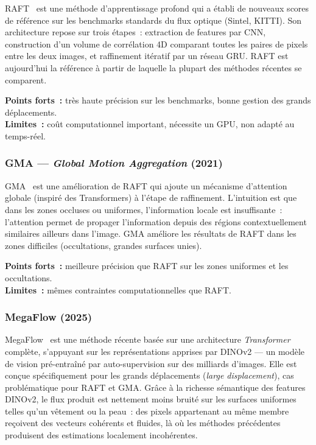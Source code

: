 RAFT~\cite{teed2020raft} est une méthode d'apprentissage profond qui a établi de nouveaux scores de référence sur les benchmarks standards du flux optique (Sintel, KITTI). Son architecture repose sur trois étapes~: extraction de features par CNN, construction d'un volume de corrélation 4D comparant toutes les paires de pixels entre les deux images, et raffinement itératif par un réseau GRU. RAFT est aujourd'hui la référence à partir de laquelle la plupart des méthodes récentes se comparent.

\medskip
\noindent\textbf{Points forts~:} très haute précision sur les benchmarks, bonne gestion des grands déplacements.\\
\textbf{Limites~:} coût computationnel important, nécessite un GPU, non adapté au temps-réel.

\subsubsection{GMA --- \textit{Global Motion Aggregation} (2021)}

GMA~\cite{jiang2021learning} est une amélioration de RAFT qui ajoute un mécanisme d'attention globale (inspiré des Transformers) à l'étape de raffinement. L'intuition est que dans les zones occluses ou uniformes, l'information locale est insuffisante~: l'attention permet de propager l'information depuis des régions contextuellement similaires ailleurs dans l'image. GMA améliore les résultats de RAFT dans les zones difficiles (occultations, grandes surfaces unies).

\medskip
\noindent\textbf{Points forts~:} meilleure précision que RAFT sur les zones uniformes et les occultations.\\
\textbf{Limites~:} mêmes contraintes computationnelles que RAFT.

\subsubsection{MegaFlow (2025)}

MegaFlow~\cite{zhang2025megaflow} est une méthode récente basée sur une architecture \textit{Transformer} complète, s'appuyant sur les représentations apprises par DINOv2 --- un modèle de vision pré-entraîné par auto-supervision sur des milliards d'images. Elle est conçue spécifiquement pour les grands déplacements (\textit{large displacement}), cas problématique pour RAFT et GMA. Grâce à la richesse sémantique des features DINOv2, le flux produit est nettement moins bruité sur les surfaces uniformes telles qu'un vêtement ou la peau~: des pixels appartenant au même membre reçoivent des vecteurs cohérents et fluides, là où les méthodes précédentes produisent des estimations localement incohérentes.

